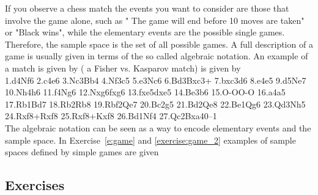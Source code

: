 \begin{example}
If you observe a chess match the events you want to consider are those that involve the game alone, such as " The game will end before 10 moves are taken" or "Black wins", while the elementary events are the possible single games. Therefore, the sample space is the set of all possible games. A full description of a game is usually given in terms of the so called algebraic notation. An example of a match is given by ( a Fisher vs. Kasparov match)  is given by \\
1.d4Nf6 2.c4e6 3.Nc3Bb4 4.Nf3c5 5.e3Nc6 6.Bd3Bxc3+ 7.bxc3d6 8.e4e5 9.d5Ne7 10.Nh4h6 11.f4Ng6 12.Nxg6fxg6 13.fxe5dxe5 14.Be3b6 15.O-OO-O 16.a4a5 17.Rb1Bd7 18.Rb2Rb8 19.Rbf2Qe7 20.Bc2g5 21.Bd2Qe8 22.Be1Qg6 23.Qd3Nh5 24.Rxf8+Rxf8 25.Rxf8+Kxf8 26.Bd1Nf4 27.Qc2Bxa40–1\\
	The algebraic notation can be seen as a way to encode elementary events and the sample space. In Exercise~\ref{e:game} and \ref{exercise:game_2} examples of sample spaces defined by simple games are given    

\end{example}





\subsection{Exercises}

